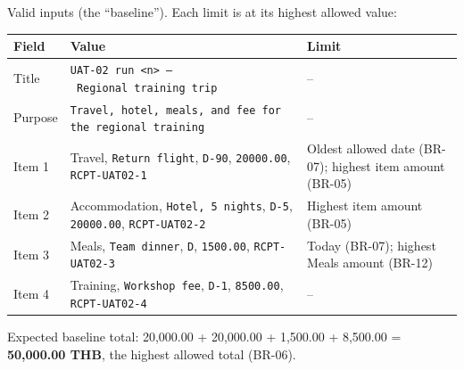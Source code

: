 Valid inputs (the ``baseline''). Each limit is at its highest allowed value:

{\def\LTcaptype{none} %
\begin{longtable}[]{@{}
  >{\raggedright\arraybackslash}p{}
  >{\raggedright\arraybackslash}p{}
  >{\raggedright\arraybackslash}p{}@{}}
\toprule\noalign{}
\begin{minipage}[b]{\linewidth}\raggedright
Field
\end{minipage} & \begin{minipage}[b]{\linewidth}\raggedright
Value
\end{minipage} & \begin{minipage}[b]{\linewidth}\raggedright
Limit
\end{minipage} \\
\midrule\noalign{}
\endhead
\bottomrule\noalign{}
\endlastfoot
Title & \texttt{UAT-02\ run\ \textless{}n\textgreater{}\ –\ Regional\ training\ trip} & -- \\
Purpose & \texttt{Travel, hotel, meals, and fee for the regional training} & -- \\
Item 1 & Travel, \texttt{Return flight}, \texttt{D-90}, \texttt{20000.00}, \texttt{RCPT-UAT02-1} & Oldest allowed date (BR-07); highest item amount (BR-05) \\
Item 2 & Accommodation, \texttt{Hotel, 5 nights}, \texttt{D-5}, \texttt{20000.00}, \texttt{RCPT-UAT02-2} & Highest item amount (BR-05) \\
Item 3 & Meals, \texttt{Team dinner}, \texttt{D}, \texttt{1500.00}, \texttt{RCPT-UAT02-3} & Today (BR-07); highest Meals amount (BR-12) \\
Item 4 & Training, \texttt{Workshop fee}, \texttt{D-1}, \texttt{8500.00}, \texttt{RCPT-UAT02-4} & -- \\
\end{longtable}
}

Expected baseline total: 20,000.00 + 20,000.00 + 1,500.00 + 8,500.00 = \textbf{50,000.00 THB}, the highest allowed total (BR-06).

